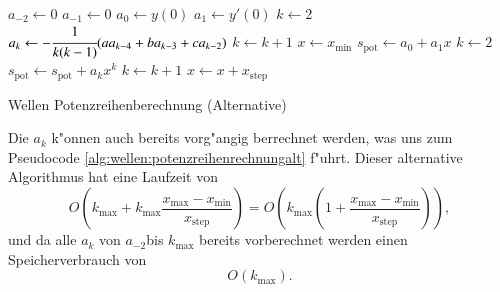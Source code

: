 \begin{algorithm}
	\begin{algorithmic}[1]
		\State $a_{-2} \gets 0$
		\State $a_{-1} \gets 0$
		\State $a_0 \gets y(0)$
		\State $a_1 \gets y'(0)$
		\State $k \gets 2$
			\State $a_k \gets -\cfrac{1}{k(k-1)} (aa_{k-4}+ba_{k-3}+ca_{k-2})$
			\State $k \gets k + 1$
		\EndFor
		\State $x \gets x_{\text{min}}$
			\State $s_{\text{pot}} \gets a_0 + a_1x$
			\State $k \gets 2$
				\State $s_{\text{pot}} \gets s_{\text{pot}} + a_k x^k$
				\State $k \gets k + 1$
			\EndFor
			\State $x \gets x + x_{\text{step}}$
		\EndFor
	\end{algorithmic}
	\caption{Wellen Potenzreihenberechnung (Alternative)}
	\label{alg:wellen:potenzreihenrechnungalt}
\end{algorithm}

Die $a_k$ k"onnen auch bereits vorg"angig berrechnet werden, was uns zum 
Pseudocode \ref{alg:wellen:potenzreihenrechnungalt} f"uhrt. Dieser 
alternative Algorithmus hat eine Laufzeit von
\begin{equation*}
	O
	\left(k_{\text{max}} + 
		k_{\text{max}}\frac{x_{\text{max}}-x_{\text{min}}}{x_{\text{step}}}
	\right)
	=
	O
	\left(
		k_{\text{max}}
		\left(
			1+\frac{x_{\text{max}}-x_{\text{min}}}{x_{\text{step}}}
		\right)
	\right),
\end{equation*}
und da alle $a_k$ von $a_{-2}$bis $k_{\text{max}}$ bereits vorberechnet werden 
einen Speicherverbrauch von
\begin{equation*}
	O
	\left(
		k_{\text{max}}
	\right).
\end{equation*}